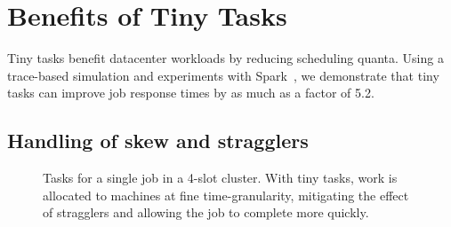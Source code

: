 \section{Benefits of Tiny Tasks}

\label{sec:benefits}

Tiny tasks benefit datacenter workloads by reducing scheduling quanta. Using
a trace-based simulation and experiments with Spark~\cite{zaharia2010spark},
we demonstrate that tiny tasks can improve job response times by 
as much as a factor of 5.2.


\subsection{Handling of skew and stragglers}

\begin{figure}[t]
\centering
{}
\vspace{-0.1in}
\caption{Tasks for a single job in a 4-slot cluster.
With tiny tasks, work is allocated to machines at fine
time-granularity, mitigating the effect of stragglers and allowing
the job to complete more quickly.}
\vspace{-2ex}
\label{fig:tiny_diagram}
\end{figure}


